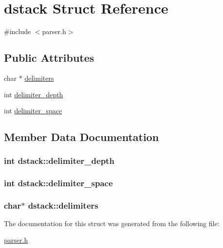 \hypertarget{structdstack}{}\section{dstack Struct Reference}
\label{structdstack}


{\ttfamily \#include $<$parser.\+h$>$}

\subsection*{Public Attributes}
\begin{DoxyCompactItemize}
\item 
char $\ast$ \hyperlink{structdstack_a76e9b09421f3da067f3edb3ba7229bc2}{delimiters}
\item 
int \hyperlink{structdstack_a32fe4eb7d39356859f098b15da622a13}{delimiter\+\_\+depth}
\item 
int \hyperlink{structdstack_a69372e28e3d49e5b0f0d7b806da50f6b}{delimiter\+\_\+space}
\end{DoxyCompactItemize}


\subsection{Member Data Documentation}
\subsubsection[{\texorpdfstring{delimiter\+\_\+depth}{delimiter_depth}}]{\setlength{\rightskip}{0pt plus 5cm}int dstack\+::delimiter\+\_\+depth}\hypertarget{structdstack_a32fe4eb7d39356859f098b15da622a13}{}\label{structdstack_a32fe4eb7d39356859f098b15da622a13}
\subsubsection[{\texorpdfstring{delimiter\+\_\+space}{delimiter_space}}]{\setlength{\rightskip}{0pt plus 5cm}int dstack\+::delimiter\+\_\+space}\hypertarget{structdstack_a69372e28e3d49e5b0f0d7b806da50f6b}{}\label{structdstack_a69372e28e3d49e5b0f0d7b806da50f6b}
\subsubsection[{\texorpdfstring{delimiters}{delimiters}}]{\setlength{\rightskip}{0pt plus 5cm}char$\ast$ dstack\+::delimiters}\hypertarget{structdstack_a76e9b09421f3da067f3edb3ba7229bc2}{}\label{structdstack_a76e9b09421f3da067f3edb3ba7229bc2}


The documentation for this struct was generated from the following file\+:\begin{DoxyCompactItemize}
\item 
\hyperlink{parser_8h}{parser.\+h}\end{DoxyCompactItemize}

